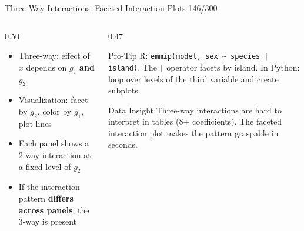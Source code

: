 \documentclass[10pt]{beamer}
\newcommand{\smark}[1]{\hfill{\scriptsize\color{codegray}#1}}
\begin{document}
\begin{frame}{Three-Way Interactions: Faceted Interaction Plots}
\smark{146/300}
\begin{columns}[T]
\begin{column}{0.50\textwidth}
\begin{itemize}
    \item Three-way: effect of $x$ depends on $g_1$ \textbf{and} $g_2$
    \item Visualization: facet by $g_2$, color by $g_1$, plot lines
    \item Each panel shows a 2-way interaction at a fixed level of $g_2$
    \item If the interaction pattern \textbf{differs across panels}, the 3-way is present
\end{itemize}
\end{column}
\begin{column}{0.47\textwidth}
\begin{alertblock}{Pro-Tip}
    \scriptsize R: \texttt{emmip(model, sex \textasciitilde\ species | island)}. The \texttt{|} operator facets by island. In Python: loop over levels of the third variable and create subplots.
\end{alertblock}
\vspace{0.1cm}
\begin{exampleblock}{Data Insight}
    \scriptsize Three-way interactions are hard to interpret in tables (8+ coefficients). The faceted interaction plot makes the pattern graspable in seconds.
\end{exampleblock}
\end{column}
\end{columns}
\end{frame}
\end{document}
